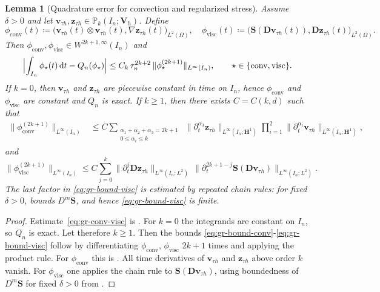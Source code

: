 \documentclass[DIV=16]{scrartcl}
\newtheorem{lemma}[theorem]{Lemma}
\newcommand{\uu}{\boldsymbol v}
\renewcommand{\vv}{\boldsymbol z}
\newcommand{\GG}{\nabla}
\newcommand{\DD}{\boldsymbol D} %
\newcommand{\Sstress}{\boldsymbol S} %
\newcommand{\In}{I_n}
\newcommand{\dt}{\partial_t}
\newcommand{\drv}{\mkern3mu\mathrm{d}}
\newcommand{\Dt}{\drv t}
\newcommand{\Pk}{\mathbb P_k}
\newcommand{\Vh}{\boldsymbol V_h}
\newcommand{\reg}{\delta}
\begin{document}
\begin{lemma}[Quadrature error for convection and regularized stress]\label{lem:gr-conv-visc}
Assume $\reg>0$ and let $\uu_{\tau h},\vv_{\tau h}\in \Pk(\In;\Vh)$. Define
\[
  \phi_{\mathrm{conv}}(t)\coloneq \bigl(\uu_{\tau h}(t)\otimes\uu_{\tau h}(t),\GG\vv_{\tau h}(t)\bigr)_{L^2(\Omega)},
  \quad
  \phi_{\mathrm{visc}}(t)\coloneq \bigl(\Sstress(\DD\uu_{\tau h}(t)),\DD\vv_{\tau h}(t)\bigr)_{L^2(\Omega)}.
\]
Then $\phi_{\mathrm{conv}},\phi_{\mathrm{visc}}\in W^{2k+1,\infty}(\In)$ and
\begin{equation}\label{eq:gr-conv-visc}
  \Bigl|\int_{\In}\phi_{\star}(t)\Dt - Q_n(\phi_{\star})\Bigr|
  \le C_k\,\tau_n^{2k+2}\,\|\phi_{\star}^{(2k+1)}\|_{L^\infty(\In)},
  \qquad \star\in\{\mathrm{conv},\mathrm{visc}\}.
\end{equation}
If $k=0$, then $\uu_{\tau h}$ and $\vv_{\tau h}$ are piecewise constant in
time on $\In$, hence $\phi_{\mathrm{conv}}$ and $\phi_{\mathrm{visc}}$ are
constant and $Q_n$ is exact. If $k\ge 1$, then there exists $C=C(k,d)$ such that
\begin{equation}\label{eq:gr-bound-conv}
  \begin{split}
    \|\phi_{\mathrm{conv}}^{(2k+1)}\|_{L^\infty(\In)}
    &\le C  \sum_{\substack{\alpha_1{+}\alpha_2{+}\alpha_3=2k{+}1\\0\le \alpha_i\le k}}\;
    \|\dt^{\alpha_3}\vv_{\tau h}\|_{L^\infty(\In;\boldsymbol H^1)}
    \prod_{i=1}^2\|\dt^{\alpha_i}\uu_{\tau h}\|_{L^\infty(\In;\boldsymbol H^1)},
  \end{split}
\end{equation}
and
\begin{equation}\label{eq:gr-bound-visc}
  \|\phi_{\mathrm{visc}}^{(2k+1)}\|_{L^\infty(\In)}
  \le C\sum_{j=0}^k
  \|\dt^{j}\DD\vv_{\tau h}\|_{L^\infty(\In;L^2)}
  \,
  \|\dt^{2k+1-j}\Sstress(\DD\uu_{\tau h})\|_{L^\infty(\In;L^2)}.
\end{equation}
The last factor in \eqref{eq:gr-bound-visc} is estimated by repeated chain rules: for fixed $\reg>0$,
 bounds $D^m\Sstress$, and hence \eqref{eq:gr-bound-visc} is finite.
\end{lemma}
\begin{proof}
Estimate~\eqref{eq:gr-conv-visc} is . For $k=0$ the
integrands are constant on $\In$, so $Q_n$ is exact. Let therefore $k\ge 1$.
Then the bounds \eqref{eq:gr-bound-conv}-\eqref{eq:gr-bound-visc} follow by
differentiating $\phi_{\mathrm{conv}}$, $\phi_{\mathrm{visc}}$ $2k{+}1$ times
and applying the product rule. For $\phi_{\mathrm{conv}}$ this is
\cite[Lemma~3.2]{MargenbergBause2026MonolithicSTMG}. All time derivatives
of $\uu_{\tau h}$ and $\vv_{\tau h}$ above order $k$ vanish. For
$\phi_{\mathrm{visc}}$ one applies the chain rule to
$\Sstress(\DD\uu_{\tau h})$, using boundedness of $D^m\Sstress$ for fixed
$\reg>0$ from .
\end{proof}
\end{document}
